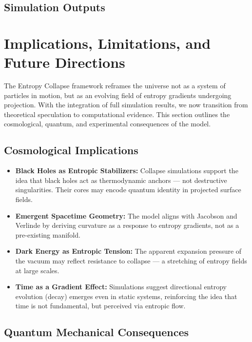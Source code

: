 \documentclass[12pt]{article}
\begin{document}
\clearpage
\subsection*{Simulation Outputs}

\clearpage
\section{Implications, Limitations, and Future Directions}

The Entropy Collapse framework reframes the universe not as a system of particles in motion, but as an evolving field of entropy gradients undergoing projection. With the integration of full simulation results, we now transition from theoretical speculation to computational evidence. This section outlines the cosmological, quantum, and experimental consequences of the model.

\clearpage
\subsection*{Cosmological Implications}

\begin{itemize}[leftmargin=1.5em]
\FloatBarrier
  \item \textbf{Black Holes as Entropic Stabilizers:} Collapse simulations support the idea that black holes act as thermodynamic anchors — not destructive singularities. Their cores may encode quantum identity in projected surface fields.

  \item \textbf{Emergent Spacetime Geometry:} The model aligns with Jacobson and Verlinde by deriving curvature as a response to entropy gradients, not as a pre-existing manifold.

  \item \textbf{Dark Energy as Entropic Tension:} The apparent expansion pressure of the vacuum may reflect resistance to collapse — a stretching of entropy fields at large scales.

  \item \textbf{Time as a Gradient Effect:} Simulations suggest directional entropy evolution (decay) emerges even in static systems, reinforcing the idea that time is not fundamental, but perceived via entropic flow.
\end{itemize}

\clearpage
\subsection*{Quantum Mechanical Consequences}
\end{document}
